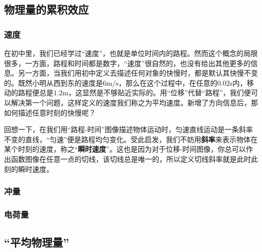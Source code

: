 
\subsection{物理量的累积效应}
\subsubsection{速度}
在初中里，我们已经学过“速度”，也就是单位时间内的路程。然而这个概念的局限很多，一方面，路程和时间都是数字，“速度”很自然的，也没有给出其他更多的信息。另一方面，当我们用初中定义去描述任何对象的快慢时，都是默认其快慢不变的。既然小明从西到东的速度是$6 \mathrm{m/s}$，那么在这个过程中，在任意的$0.02\mathrm s$内，移动的路程便总是$1.2\mathrm m$，这显然是不够贴近实际的。用“位移”代替“路程”，我们便可以解决第一个问题，这样定义的速度我们称之为平均速度。新增了方向信息后，那如何描述任意时刻的快慢呢？

回想一下，在我们用“路程-时间”图像描述物体运动时，匀速直线运动是一条斜率不变的直线，“匀速”便是路程均匀变化。受此启发，我们不妨用\textbf{斜率}来表示物体在某个时刻的速度，称之“\textbf{瞬时速度}”。这也是因为对于位移-时间图像，你总可以作出函数图像在任意一点的切线，该切线总是唯一的，所以定义切线斜率就是此时此刻的瞬时速度。
\subsubsection{冲量}
\subsubsection{电荷量}
\subsection{“平均物理量”}